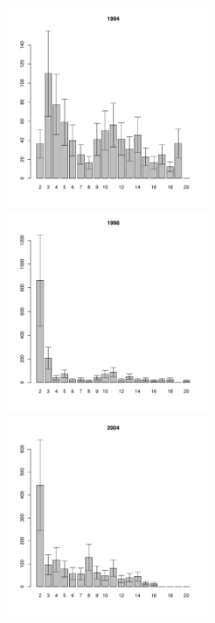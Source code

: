 \begin{figure}[hp]
	\begin{minipage}[b]{.3\linewidth}
	\begin{center}
	\includegraphics[width=60mm]{../White_Sea/Luvenga_II_razrez/zostera_zone2_1994_.pdf}
	\end{center}
	\end{minipage}
	\hfill
	\begin{minipage}[b]{.3\linewidth}
	\begin{center}
	\includegraphics[width=60mm]{../White_Sea/Luvenga_II_razrez/zostera_zone2_1998_.pdf}
	\end{center}
	\end{minipage}	
	\hfill
	\begin{minipage}[b]{.3\linewidth}
	\begin{center}
	\includegraphics[width=60mm]{../White_Sea/Luvenga_II_razrez/zostera_zone2_2004_.pdf}
	\end{center}
	\end{minipage}


\end{figure}
